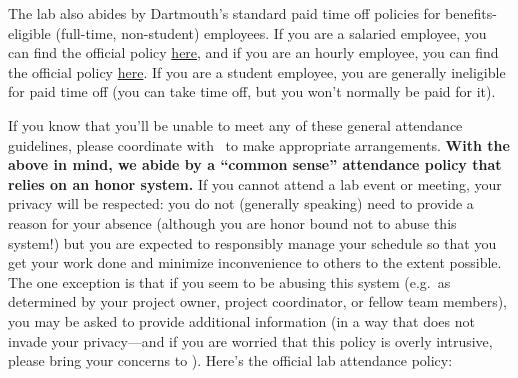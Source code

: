 \documentclass{tufte-book} %
\begin{document}
The lab also abides by Dartmouth's standard paid time off policies for
benefits-eligible (full-time, non-student) employees.  If you are a
salaried employee, you can find the official policy
\href{http://www.dartmouth.edu/~hrs/pdfs/paid_time_off_salaried.pdf}{here},
and if you are an hourly employee, you can find the official policy
\href{http://www.dartmouth.edu/~hrs/pdfs/Paid_Time_Off_Hourly.pdf}{here}.
If you are a student employee, you are generally ineligible for paid
time off (you can take time off, but you won't normally be paid for it).

If you know that you'll be unable to meet any of these general
attendance guidelines, please coordinate with \director~to make
appropriate arrangements.  \textbf{With the above in mind, we abide by
  a ``common sense'' attendance policy that relies on an honor
  system.}  If you
cannot attend a lab event or meeting, your privacy will be respected:
you do not (generally speaking) need to provide a reason for your
absence (although you are honor bound not to abuse this system!) but
you are expected to responsibly manage your schedule so that you get
your work done and minimize inconvenience to others to the extent
possible.  The one exception is that if you seem to be abusing this
system (e.g.\ as determined by your project owner, project
coordinator, or fellow team members), you may be asked to provide
additional information (in a way that does not invade your privacy---and
 if you are worried that this policy is overly intrusive, please
bring your concerns to \director).  Here's the
official lab attendance policy:
\end{document}
